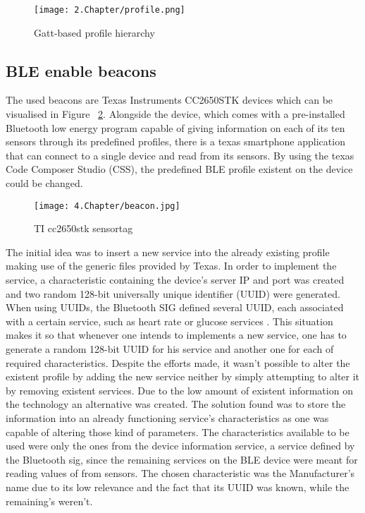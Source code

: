 \begin{figure}[H]  
\centering  
\texttt{[image: 2.Chapter/profile.png]}  
\caption[Gatt-based profile hierarchy]{Gatt-based profile hierarchy}  
\label{fig:profile}  
\end{figure}  
 
 
  
\subsection{\ac{BLE} enable beacons}  
\label{sec:ble-beacon}  
 
 
 
 
The used beacons are Texas Instruments CC2650STK devices which can be visualised in Figure ~\ref{fig:beacon}. Alongside the device, which comes with a pre-installed Bluetooth low energy program capable of giving information on each of its ten sensors through its predefined profiles, there is a texas smartphone application that can connect to a single device and read from its sensors. By using the texas Code Composer Studio (CSS), the predefined \ac{BLE} profile existent on the device could be changed.  
 
 
 \begin{figure} [H] 
\centering  
\texttt{[image: 4.Chapter/beacon.jpg]}  
\caption[TI cc2650stk sensortag]{TI cc2650stk sensortag}  
\label{fig:beacon}  
\end{figure}  
 
 
The initial idea was to insert a new service into the already existing profile making use of the generic files provided by Texas.   
In order to implement the service, a characteristic containing the device's server IP and port was created and two random 128-bit universally unique identifier (UUID) were generated. When using UUIDs, the Bluetooth SIG defined several UUID, each associated with a certain service, such as heart rate or glucose services \cite{bleservices}. This situation makes it so that whenever one intends to implements a new service, one has to generate a random 128-bit UUID for his service and another one for each of required characteristics.  
Despite the efforts made, it wasn't possible to alter the existent profile by adding the new service neither by simply attempting to alter it by removing existent services. Due to the low amount of existent information on the technology an alternative was created. The solution found was to store the information into an already functioning service's characteristics as one was capable of altering those kind of parameters. The characteristics available to be used were only the ones from the device information service, a service defined by the Bluetooth sig, since the remaining services on the \ac{BLE} device were meant for reading values of from sensors. The chosen characteristic was the Manufacturer's name due to its low relevance and the fact that its UUID was known, while the remaining's weren't.  
  
